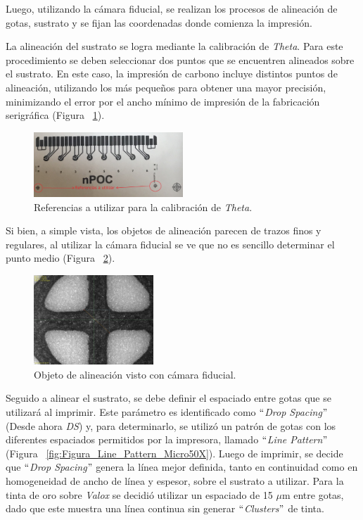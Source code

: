 Luego, utilizando la cámara fiducial, se realizan los procesos de alineación de gotas, sustrato y se fijan las coordenadas donde comienza la impresión.

La alineación del sustrato se logra mediante la calibración de \textit{Theta}. Para este procedimiento se deben seleccionar dos puntos que se encuentren alineados sobre el sustrato. En este caso, la impresión de carbono incluye distintos puntos de alineación, utilizando los más pequeños para obtener una mayor precisión, minimizando el error por el ancho mínimo de impresión de la fabricación serigráfica (Figura ~\ref{fig:Figura_alineacion_theta}).

\begin{figure}[H]
  \centering
    \includegraphics[width=0.5\textwidth]{Figuras/Figura_alineacion_theta}
  \caption{Referencias a utilizar para la calibración de \textit{Theta}.}
  \label{fig:Figura_alineacion_theta}
\end{figure}

Si bien, a simple vista, los objetos de alineación parecen de trazos finos y regulares, al utilizar la cámara fiducial se ve que no es sencillo determinar el punto medio (Figura ~\ref{fig:Figura_alineacion_theta2}).

\begin{figure}[H]
  \centering
    \includegraphics[width=0.4\textwidth]{Figuras/Figura_alineacion_theta2}
  \caption{Objeto de alineación visto con cámara fiducial.}
  \label{fig:Figura_alineacion_theta2}
\end{figure}

Seguido a alinear el sustrato, se debe definir el espaciado entre gotas que se utilizará al imprimir. Este parámetro es identificado como $``$\textit{Drop Spacing}$"$ (Desde ahora \emph{DS}) y, para determinarlo, se utilizó un patrón de gotas con los diferentes espaciados permitidos por la impresora, llamado $``$\textit{Line Pattern}$"$(Figura ~\ref{fig:Figura_Line_Pattern_Micro50X}). Luego de imprimir, se decide que $``$\textit{Drop Spacing}$"$ genera la línea mejor definida, tanto en continuidad como en homogeneidad de ancho de línea y espesor, sobre el sustrato a utilizar. Para la tinta de oro sobre \textit{Valox} se decidió utilizar un espaciado de 15 $\mu$m entre gotas, dado que este muestra una línea continua sin generar $``$\textit{Clusters}$"$ de tinta.

